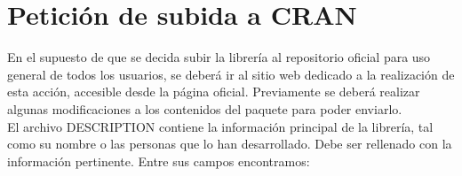 \section{Petición de subida a CRAN}
En el supuesto de que se decida subir la librería al repositorio oficial para uso general de todos los usuarios, se deberá ir al sitio web dedicado a la realización de esta acción, accesible desde la página oficial. Previamente se deberá realizar algunas modificaciones a los contenidos del paquete para poder enviarlo.\\

El archivo DESCRIPTION contiene la información principal de la librería, tal como su nombre o las personas que lo han desarrollado. Debe ser rellenado con la información pertinente. Entre sus campos encontramos: \\

